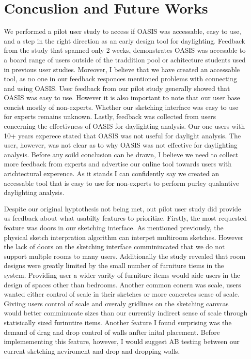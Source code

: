 \chapter{Concuslion and Future Works} \label{sec:results}

We performed a pilot user study to access if OASIS was accessable, easy to use, and a step in the right direction as an early design tool for daylighting.
Feedback from the study that spanned only 2 weeks, demonstrates OASIS was aceesable to a board range of users outside of the traddition pool or achitecture students used in previous user studies.
Moreover, I believe that we have created an accessable tool, as no one in our feedback responces mentioned problems with connecting and using OASIS.
User feedback from our pilot study generally showed that OASIS was easy to use.
However it is also important to note that our user base concist mostly of non-experts. 
Whether our sketching interface was easy to use for experts remains unknown.
Lastly, feedback was collected from users concerning the effectivness of OASIS for daylighting analysis.
Our one users with 10+ years experece stated that OASIS was not useful for daylight analysis.
The user, however, was not clear as to why OASIS was not effective for daylighting analysis.
Before any soild conclusion can be drawn, I believe we need to collect more feedback from experts and advertise our online tool towards users with arichtectural experence.
As it stands I can confidently say we created an accessable tool that is easy to use for non-experts to perform purley qualantive daylighting analysis.

Despite our original hyptothesis not being met,
 out pilot user study did provide us feedback about what usabilty features to prioritize.
Firstly, the most requested feature was doors in our sketching interface.
As mentioned previously, the physical sketch interpration algorithm can interpet multiroom sketches.
However the lack of doors on the sketching interface comminiucated that we do not support multple rooms to many users.
Additionally the study revealed that room designs were greatly limited by the small number of furniture tiems in the system.
Providing user a wider varity of furniture items would aide users in the design of spaces other than bedrooms.
Another common conern was scale, users wanted either control of scale in their sketches or more concretes sense of scale.
Giviing users control of scale and overaly gridlines on the sketching canvcas would better comminucate sizes than our currently indirect sense of scale through statisically sized furinutire items.
Another feature I found surprising was the demand of drag and drop control of walls anfter inital placement.
Before implemementing this feature, however, I would suggest AB testing between our current sketching neviroment and drop and dropping walls.

